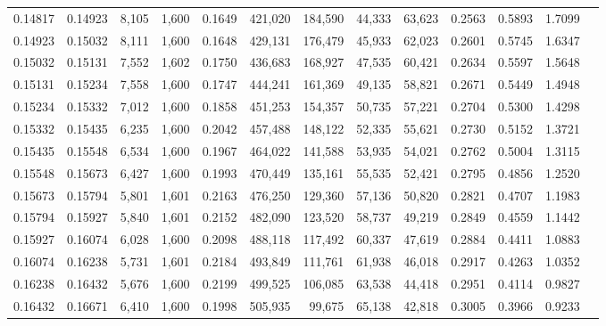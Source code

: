 \begin{tabular}{rrrrrrrrrrrrr}
0.14817 & 0.14923 &  8,105 & 1,600 &                                     0.1649 & 421,020 & 184,590 &  44,333 &  63,623 & 0.2563 & 0.5893 & 1.7099 \\
0.14923 & 0.15032 &  8,111 & 1,600 &                                     0.1648 & 429,131 & 176,479 &  45,933 &  62,023 & 0.2601 & 0.5745 & 1.6347 \\
0.15032 & 0.15131 &  7,552 & 1,602 &                                     0.1750 & 436,683 & 168,927 &  47,535 &  60,421 & 0.2634 & 0.5597 & 1.5648 \\
0.15131 & 0.15234 &  7,558 & 1,600 &                                     0.1747 & 444,241 & 161,369 &  49,135 &  58,821 & 0.2671 & 0.5449 & 1.4948 \\
0.15234 & 0.15332 &  7,012 & 1,600 &                                     0.1858 & 451,253 & 154,357 &  50,735 &  57,221 & 0.2704 & 0.5300 & 1.4298 \\
0.15332 & 0.15435 &  6,235 & 1,600 &                                     0.2042 & 457,488 & 148,122 &  52,335 &  55,621 & 0.2730 & 0.5152 & 1.3721 \\
0.15435 & 0.15548 &  6,534 & 1,600 &                                     0.1967 & 464,022 & 141,588 &  53,935 &  54,021 & 0.2762 & 0.5004 & 1.3115 \\
0.15548 & 0.15673 &  6,427 & 1,600 &                                     0.1993 & 470,449 & 135,161 &  55,535 &  52,421 & 0.2795 & 0.4856 & 1.2520 \\
0.15673 & 0.15794 &  5,801 & 1,601 &                                     0.2163 & 476,250 & 129,360 &  57,136 &  50,820 & 0.2821 & 0.4707 & 1.1983 \\
0.15794 & 0.15927 &  5,840 & 1,601 &                                     0.2152 & 482,090 & 123,520 &  58,737 &  49,219 & 0.2849 & 0.4559 & 1.1442 \\
0.15927 & 0.16074 &  6,028 & 1,600 &                                     0.2098 & 488,118 & 117,492 &  60,337 &  47,619 & 0.2884 & 0.4411 & 1.0883 \\
0.16074 & 0.16238 &  5,731 & 1,601 &                                     0.2184 & 493,849 & 111,761 &  61,938 &  46,018 & 0.2917 & 0.4263 & 1.0352 \\
0.16238 & 0.16432 &  5,676 & 1,600 &                                     0.2199 & 499,525 & 106,085 &  63,538 &  44,418 & 0.2951 & 0.4114 & 0.9827 \\
0.16432 & 0.16671 &  6,410 & 1,600 &                                     0.1998 & 505,935 &  99,675 &  65,138 &  42,818 & 0.3005 & 0.3966 & 0.9233 \\

\end{tabular}
